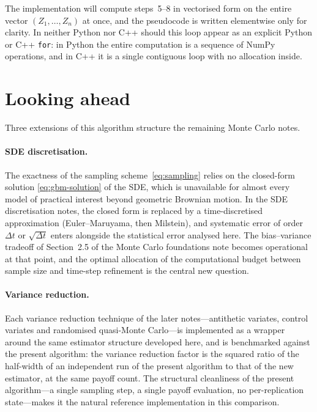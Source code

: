 \documentclass[11pt,a4paper]{article}
\theoremstyle{plain}
\theoremstyle{definition}
\theoremstyle{remark}
\begin{document}
The implementation will compute steps~5--8 in vectorised form on the
entire vector $(Z_1, \dots, Z_n)$ at once, and the pseudocode is
written elementwise only for clarity. In neither Python nor C++ should
this loop appear as an explicit Python or C++ \texttt{for}: in Python
the entire computation is a sequence of NumPy operations, and in C++
it is a single contiguous loop with no allocation inside.

\section{Looking ahead}
\label{sec:ahead}

Three extensions of this algorithm structure the remaining Monte Carlo notes.

\paragraph{SDE discretisation.} The exactness of the sampling
scheme~\eqref{eq:sampling} relies on the closed-form solution
\eqref{eq:gbm-solution} of the SDE, which is unavailable for almost
every model of practical interest beyond geometric Brownian motion. In
the SDE discretisation notes, the closed form is replaced by a
time-discretised approximation (Euler--Maruyama, then Milstein), and
systematic error of order $\Delta t$ or $\sqrt{\Delta t}$ enters
alongside the statistical error analysed here. The bias--variance
tradeoff of Section~2.5 of the Monte Carlo foundations note becomes
operational at
that point, and the optimal allocation of the computational budget
between sample size and time-step refinement is the central new
question.

\paragraph{Variance reduction.} Each variance reduction
technique of the later notes---antithetic variates, control variates and
randomised quasi-Monte Carlo---is implemented as a wrapper around the same
estimator structure developed here, and is benchmarked against the
present algorithm: the variance reduction factor is the squared ratio
of the half-width of an independent run of the present algorithm to
that of the new estimator, at the same payoff count. The structural
cleanliness of
the present algorithm---a single sampling step, a single payoff
evaluation, no per-replication state---makes it the natural reference
implementation in this comparison.
\end{document}
